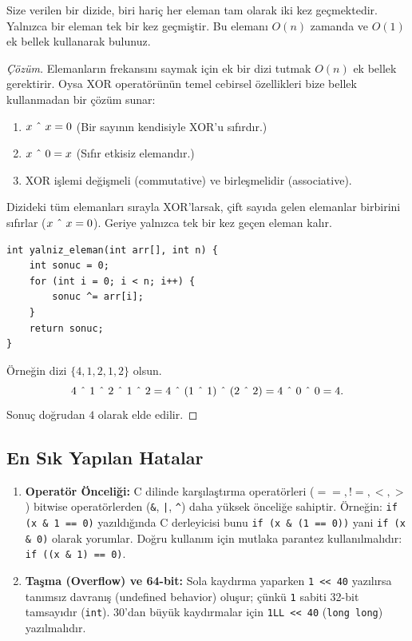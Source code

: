 \begin{example}
Size verilen bir dizide, biri hariç her eleman tam olarak iki kez geçmektedir. Yalnızca bir eleman tek bir kez geçmiştir. Bu elemanı $O(n)$ zamanda ve $O(1)$ ek bellek kullanarak bulunuz.
\end{example}

\begin{proof}[Çözüm]
Elemanların frekansını saymak için ek bir dizi tutmak $O(n)$ ek bellek gerektirir. Oysa XOR operatörünün temel cebirsel özellikleri bize bellek kullanmadan bir çözüm sunar:
\begin{enumerate}
    \item $x \ \string^\ x = 0$ (Bir sayının kendisiyle XOR'u sıfırdır.)
    \item $x \ \string^\ 0 = x$ (Sıfır etkisiz elemandır.)
    \item XOR işlemi değişmeli (commutative) ve birleşmelidir (associative).
\end{enumerate}
Dizideki tüm elemanları sırayla XOR'larsak, çift sayıda gelen elemanlar birbirini sıfırlar ($x \ \string^\ x = 0$). Geriye yalnızca tek bir kez geçen eleman kalır.

\begin{lstlisting}[language=CTemel]
int yalniz_eleman(int arr[], int n) {
    int sonuc = 0;
    for (int i = 0; i < n; i++) {
        sonuc ^= arr[i];
    }
    return sonuc;
}
\end{lstlisting}
Örneğin dizi $\{4, 1, 2, 1, 2\}$ olsun.
\[
4 \ \string^\ 1 \ \string^\ 2 \ \string^\ 1 \ \string^\ 2 = 4 \ \string^\ (1 \ \string^\ 1) \ \string^\ (2 \ \string^\ 2) = 4 \ \string^\ 0 \ \string^\ 0 = 4.
\]
Sonuç doğrudan $4$ olarak elde edilir.
\end{proof}

\subsection*{En Sık Yapılan Hatalar}
\begin{enumerate}
    \item \textbf{Operatör Önceliği:} C dilinde karşılaştırma operatörleri ($==, !=, <, >$) bitwise operatörlerden (\lstinline|&|, \lstinline/|/, \lstinline|^|) daha yüksek önceliğe sahiptir. Örneğin:
    \lstinline|if (x & 1 == 0)| yazıldığında C derleyicisi bunu \lstinline|if (x & (1 == 0))| yani \lstinline|if (x & 0)| olarak yorumlar. Doğru kullanım için mutlaka parantez kullanılmalıdır: \lstinline|if ((x & 1) == 0)|.
    \item \textbf{Taşma (Overflow) ve 64-bit:} Sola kaydırma yaparken \lstinline|1 << 40| yazılırsa tanımsız davranış (undefined behavior) oluşur; çünkü \lstinline|1| sabiti 32-bit tamsayıdır (\lstinline|int|). 30'dan büyük kaydırmalar için \lstinline|1LL << 40| (\lstinline|long long|) yazılmalıdır.
\end{enumerate}

